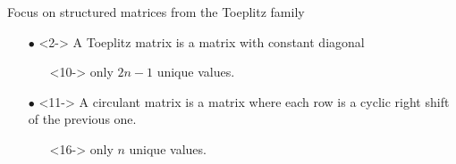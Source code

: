 \begin{frame}{Focus on structured matrices from the Toeplitz family}
\begin{minipage}{\textwidth}
\begin{tikzpicture}
    \end{tikzpicture}
  \end{minipage}


  \vspace{0.3cm}

  {\small
  \begin{itemize}[leftmargin=5pt]
    \item[$\bullet$]<2-> A Toeplitz matrix is a matrix with constant diagonal
    \begin{itemize}
      \item[\orange{$\rightarrow$}]<10-> only $2n - 1$ unique values.
    \end{itemize}
    \item[$\bullet$]<11-> A circulant matrix is a matrix where each row is a cyclic right shift of the previous one.
    \begin{itemize}
      \item[\orange{$\rightarrow$}]<16-> only $n$ unique values.
    \end{itemize}
  \end{itemize}
  }


\end{frame}



%
%   
%




